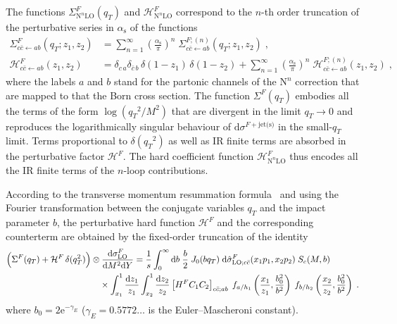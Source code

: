 \documentclass[12pt]{article}
\DeclareRobustCommand{\nn}{\nonumber}
\DeclareRobustCommand{\alphas}{\ensuremath{\alpha_{\mathrm{s}}}\xspace}
\DeclareRobustCommand{\as}{\alphas}
\DeclareRobustCommand{\asOpi}{\ensuremath{\left(\frac{\as}{\pi}\right)}} %
\DeclareRobustCommand{\mur}{\ensuremath{\mu_{\mathrm{R}}}\xspace}
\DeclareRobustCommand{\muf}{\ensuremath{\mu_{\mathrm{F}}}\xspace}
\DeclareRobustCommand{\qt}{\ensuremath{q_T}\xspace}
\DeclareRobustCommand{\rd}{\ensuremath{\mathrm{d}}}
\DeclareRobustCommand{\cH}{\ensuremath{\mathcal{H}}}
\DeclareRobustCommand{\jets}{\text{jet(s)}\xspace}
\DeclareRobustCommand{\LO}{\text{LO}\xspace}
\DeclareRobustCommand{\N}[1]{\ensuremath{\text{N}^{#1}}} %
\begin{document}
The functions $\Sigma^{F}_{\N{n}\LO}(\qt)$ and $\cH^{F}_{\N{n}\LO}$ correspond to the $n$-th order truncation of the perturbative series in $\as$ of the functions
\begin{align}
  \Sigma^F_{c\bar{c} \gets ab}(\qt; z_1,z_2) %
  &=
  \sum_{n=1}^\infty \asOpi^n \; 
  \Sigma^{F;(n)}_{c\bar{c} \gets ab}(\qt; z_1,z_2) %
  \;,
  \label{eq:sigexpansion}
  \\
  \cH^F_{c\bar{c} \gets ab}(z_1,z_2) %
  &=
  \delta_{c\,a}\delta_{\bar{c}\,b} \, \delta(1-z_1) \, \delta(1-z_2) +
  \sum_{n=1}^\infty \asOpi^n \; 
  \cH^{F;(n)}_{c\bar{c} \gets ab}(z_1,z_2) %
  \;,
  \label{Hstexpand}
\end{align}
where the labels $a$ and $b$ stand for the partonic channels of the \N{n}\LO correction that are mapped to that the Born cross section. 
The function $ \Sigma^{F}(\qt)$ embodies all the terms of the form $\log(\qt^2/M^2)$ that are divergent in the limit $\qt \rightarrow 0$ and reproduces the logarithmically singular behaviour of  $\rd\sigma^{F+\jets}$ in the small-$\qt$ limit. 
Terms proportional to $\delta(\qt^{2})$ as well as IR finite terms are absorbed in the perturbative factor $\mathcal{H}^{F}$. The hard coefficient function $\mathcal{H}^{F}_{\N{n}\LO}$ thus encodes all the IR finite terms of the $n$-loop contributions.

According to the transverse momentum resummation formula~\cite{Bozzi:2005wk} and using the Fourier transformation between the conjugate variables $\qt$ and the impact parameter $b$, the perturbative hard function $\cH^{F}$ and the corresponding counterterm are obtained by the fixed-order truncation of the identity 
\begin{align}
  \Bigl( \Sigma^F(\qt)  + \cH^F\,\delta(\qt^2) \Bigr) &\otimes 
  \frac{\rd\sigma^{F}_{\LO}}{\rd M^2\rd Y} 
  =
  \frac{1}{s}\int_0^\infty\rd b\;\frac{b}{2}\;J_0(b\qt)\;
  \rd\hat{\sigma}^{F}_{\LO;c\bar{c}}(x_1 p_1, x_2 p_2) \; 
  S_c(M,b) \; 
  \nn\\&\quad\times
\int_{x_{1}}^1 \frac{\rd z_1}{z_{1}} \int_{x_{2}}^1  \frac{\rd z_2}{z_{2}} 
  \left[ H^{F} C_1 C_2 \right]_{c\bar{c};ab} \;
  f_{a/h_1}\left(\frac{x_1}{z_1},\frac{b_0^2}{b^2}\right) \; f_{b/h_2}\left(\frac{x_2}{z_2},\frac{b_0^2}{b^2}\right) \;.
  \label{reslean}
\end{align}
where  $b_0=2 \mathrm{e}^{-\gamma_E}$ ($\gamma_E=0.5772\ldots$  is the Euler--Mascheroni constant).
\end{document}
